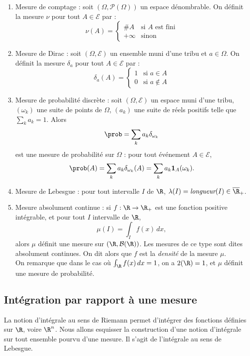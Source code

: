 \begin{enumerate}
	\item Mesure de comptage : soit $(\Omega,\mathcal{P}(\Omega))$ un espace dénombrable. On définit la mesure $\nu$ pour tout $A \in \mathcal{E}$ par :
	$$\nu(A)=
	\begin{cases}
	\#A & \text{si $A$ est fini} \\
	+\infty & \text{sinon}
	\end{cases}$$
	\item Mesure de Dirac : soit $(\Omega,\mathcal{E})$ un ensemble muni d'une tribu et $a \in \Omega$. On définit la mesure $\delta_a$ pour tout $A \in \mathcal{E}$ par :
	$$\delta_a(A)=
	\begin{cases}
	1 & \text{si $a \in A$} \\
	0 & \text{si $a \notin A$}
	\end{cases}$$
	\item Mesure de probabilité discrète : soit $(\Omega,\mathcal{E})$ un espace muni d'une tribu, $(\omega_k)$ une suite de points de $\Omega$, $(a_k)$ une suite de réels positifs telle que $\sum_k a_k = 1$. Alors 
	$$\prob = \sum_k a_k \delta_{\omega_k}$$
	est une mesure de probabilité sur $\Omega$ : pour tout événement $A \in \mathcal{E}$, $$\prob(A)= \sum_k a_k \delta_{\omega_k}(A) = \sum_k a_k  \textbf{1}_A(\omega_k).$$
	\item Mesure de Lebesgue : pour tout intervalle $I$ de $\R$, $\lambda(I) = \text{\it longueur}(I) \in \overline{\R}_+$.
	\item Mesure absolument continue : si $f:\R\to \R_+$ est une fonction positive intégrable, et pour tout $I$ intervalle de $\R$,
	$$\mu(I) = \int_I f(x) \, dx,$$
alors $\mu$ définit une mesure sur $(\R,\mathcal{B}(\R))$. Les mesures de ce type sont dites absolument continues. On dit alors que $f$ est la {\it densité} de la mesure $\mu$.
\\[1mm]
On remarque que dans le cas où $\int_\R f(x) \, dx = 1$, on a $\mu(\R)=1$, et $\mu$ définit une mesure de probabilité.

\end{enumerate}

\subsection{Intégration par rapport à une mesure}

La notion d'intégrale au sens de Riemann permet d'intégrer des fonctions définies sur $\R$, voire $\R^n$. Nous allons esquisser la construction d'une notion d'intégrale sur tout ensemble pourvu d'une mesure. Il s'agit de l'intégrale au sens de Lebesgue.

